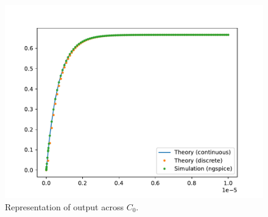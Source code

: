 \documentclass[journal,12pt,twocolumn]{IEEEtran}
\renewcommand\thesection{\arabic{section}}
\begin{document}
\begin{enumerate}[label=\arabic*.,ref=\thesection.\theenumi]
\begin{figure}
    \includegraphics[width=\columnwidth]{figs/4_7.pdf}
    \caption{Representation of output across $C_0$.}
    \label{fig:vc0}
\end{figure}
\end{enumerate}
\end{document}
